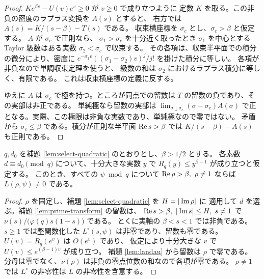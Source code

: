 \begin{proof}
\(K e^{\beta v}-U(v)e^v\ge0\) が \(v\ge0\) で成り立つように
定数 \(K\) を取る。この非負の密度のラプラス変換を \(A(s)\) とすると、
右方では \(A(s)=K/(s-\beta)-T(s)\) である。
収束横座標を \(\sigma_c\) とし、\(\sigma_c>\beta\) と仮定する。
\(A\) が \(\sigma_c\) で正則なら、
\(\sigma_1>\sigma_c\) を十分近く取ったとき \(\sigma_1\) を中心とする
Taylor 級数はある実数 \(\sigma_2<\sigma_c\) で収束する。
その各項は、収束半平面での積分の微分により、密度に
\(e^{-\sigma_1 v}((\sigma_1-\sigma_2)v)^j/j!\) を掛けた積分に等しい。
各項が非負なので単調収束定理を使うと、
級数の和は \(\sigma_2\) におけるラプラス積分に等しく、有限である。
これは収束横座標の定義に反する。

ゆえに \(A\) は \(\sigma_c\) で極を持つ。ところが同点での留数は
\(T\) の留数の負であり、その実部は非正である。
単純極なら留数の実部は
\(\lim_{\sigma\downarrow\sigma_c}(\sigma-\sigma_c)A(\sigma)\)
で正となる。実際、この極限は非負な実数であり、単純極なので零ではない。
矛盾から \(\sigma_c\le\beta\) である。積分が正則な半平面
\(\operatorname{Re} s>\beta\) では \(K/(s-\beta)-A(s)\) も正則である。
\end{proof}

\begin{proposition}\label{prop:one-sided-criterion}
\(q,d_0\) を補題 \ref{lem:select-quadratic} のとおりとし、\(\beta>1/2\) とする。
各素数 \(d\equiv d_0\pmod q\) について、十分大きな実数 \(y\) で
\(R_q(y)\le y^{\beta-1}\) が成り立つと仮定する。
このとき、すべての \(\psi\bmod q\) について
\(\RePart\rho>\beta,\ \rho\ne1\) ならば \(L(\rho,\psi)\ne0\) である。
\end{proposition}

\begin{proof}
\(\rho\) を固定し、補題 \ref{lem:select-quadratic} を \(H=|\operatorname{Im}\rho|\) に
適用して \(d\) を選ぶ。補題 \ref{lem:prime-transform} の留数は、
\(\operatorname{Re} s>\beta,\ |\operatorname{Im} s|\le H,\ s\ne1\) で
\(\nu(s)/\bigl(\varphi(q)s(1-s)\bigr)\) である。
とくに実軸の \(\beta<s<1\) では非負である。
\(s\ge1\) では整関数化した \(L^\circ(s,\psi)\) は非零であり、留数も零である。
\(U(v)=R_q(e^v)\) は \(O(e^v)\) であり、
仮定により十分大きな \(v\) で \(U(v)\le e^{(\beta-1)v}\) が成り立つ。
補題 \ref{lem:landau} から留数は \(\rho\) で零である。
分母は零でなく、\(\nu(\rho)\) は非負の零点位数の和なので各項が零である。
\(\rho\ne1\) では \(L^\circ\) の非零性は \(L\) の非零性を含意する。
\end{proof}

